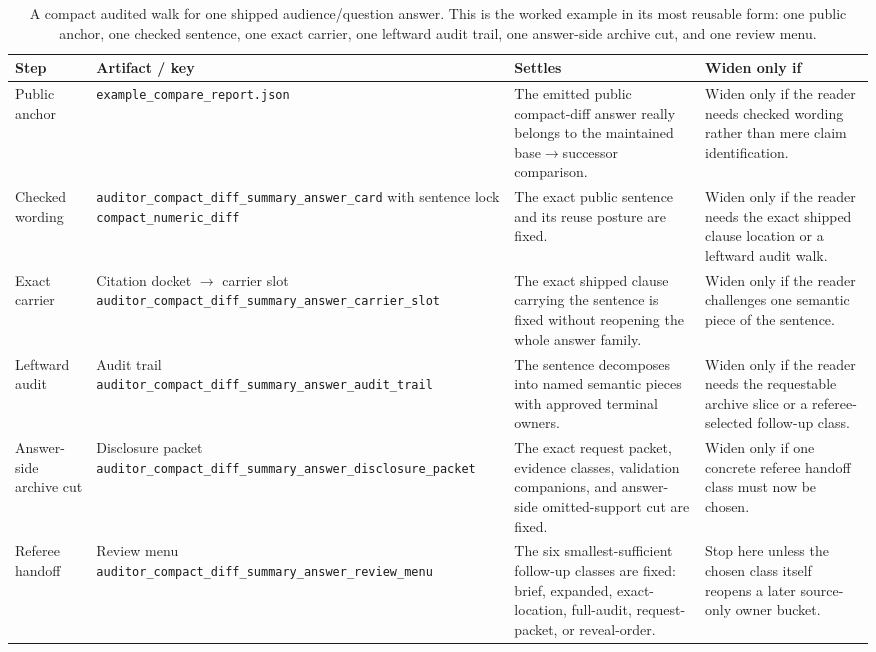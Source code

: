 \documentclass[11pt]{article}
\begin{document}
\begin{table}[t]
\centering
\small
\begin{tabularx}{\linewidth}{@{}l l X X@{}}
\toprule
Step & Artifact / key & Settles & Widen only if \\
\midrule
Public anchor & \texttt{example\_compare\_report.json} & The emitted public compact-diff answer really belongs to the maintained base$\to$successor comparison. & Widen only if the reader needs checked wording rather than mere claim identification. \\
Checked wording & \texttt{auditor\_compact\_diff\_summary\_answer\_card} with sentence lock \texttt{compact\_numeric\_diff} & The exact public sentence and its reuse posture are fixed. & Widen only if the reader needs the exact shipped clause location or a leftward audit walk. \\
Exact carrier & Citation docket $\to$ carrier slot \texttt{auditor\_compact\_diff\_summary\_answer\_carrier\_slot} & The exact shipped clause carrying the sentence is fixed without reopening the whole answer family. & Widen only if the reader challenges one semantic piece of the sentence. \\
Leftward audit & Audit trail \texttt{auditor\_compact\_diff\_summary\_answer\_audit\_trail} & The sentence decomposes into named semantic pieces with approved terminal owners. & Widen only if the reader needs the requestable archive slice or a referee-selected follow-up class. \\
Answer-side archive cut & Disclosure packet \texttt{auditor\_compact\_diff\_summary\_answer\_disclosure\_packet} & The exact request packet, evidence classes, validation companions, and answer-side omitted-support cut are fixed. & Widen only if one concrete referee handoff class must now be chosen. \\
Referee handoff & Review menu \texttt{auditor\_compact\_diff\_summary\_answer\_review\_menu} & The six smallest-sufficient follow-up classes are fixed: brief, expanded, exact-location, full-audit, request-packet, or reveal-order. & Stop here unless the chosen class itself reopens a later source-only owner bucket. \\
\bottomrule
\end{tabularx}
\caption{A compact audited walk for one shipped audience/question answer. This is the worked example in its most reusable form: one public anchor, one checked sentence, one exact carrier, one leftward audit trail, one answer-side archive cut, and one review menu.}
\label{tab:workedexample-concrete-drill}
\end{table}
\end{document}
